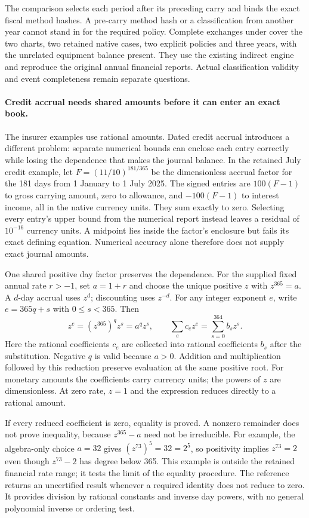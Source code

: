 The comparison selects each period after its preceding carry and binds the
exact fiscal method hashes. A pre-carry method hash or a classification from
another year cannot stand in for the required policy. Complete exchanges under
 cover the
two charts, two retained native cases, two explicit policies and three years,
with the unrelated equipment balance present. They use the existing indirect
engine and reproduce the original annual financial reports. Actual
classification validity and event completeness remain separate questions.


\paragraph{Credit accrual needs shared amounts before it can enter an exact book.}
The insurer examples use rational amounts. Dated credit accrual introduces a
different problem: separate numerical bounds can enclose each entry correctly
while losing the dependence that makes the journal balance. In the retained
July credit example, let $F=(11/10)^{181/365}$ be the dimensionless accrual
factor for the 181 days from 1 January to 1 July 2025. The signed entries are
$100(F-1)$ to gross carrying amount, zero to allowance, and $-100(F-1)$ to
interest income, all in the native currency units. They sum exactly to zero.
Selecting every entry's upper bound from the numerical report instead leaves
a residual of $10^{-16}$ currency units. A midpoint lies inside the factor's
enclosure but fails its exact defining equation. Numerical accuracy alone
therefore does not supply exact journal amounts.

One shared positive day factor preserves the dependence. For the supplied
fixed annual rate $r>-1$, set $a=1+r$ and choose the unique positive $z$ with
$z^{365}=a$. A $d$-day accrual uses $z^d$; discounting uses $z^{-d}$. For any
integer exponent $e$, write $e=365q+s$ with $0\leq s<365$. Then
\[
 z^e=(z^{365})^qz^s=a^qz^s,
 \qquad
 \sum_e c_ez^e=\sum_{s=0}^{364}b_sz^s .
\]
Here the rational coefficients $c_e$ are collected into rational coefficients
$b_s$ after the substitution. Negative $q$ is valid because $a>0$. Addition
and multiplication followed by this reduction preserve evaluation at the
same positive root. For monetary amounts the coefficients carry currency
units; the powers of $z$ are dimensionless. At zero rate, $z=1$ and the
expression reduces directly to a rational amount.

If every reduced coefficient is zero, equality is proved. A nonzero remainder
does not prove inequality, because $z^{365}-a$ need not be irreducible. For
example, the algebra-only choice $a=32$ gives $(z^{73})^5=32=2^5$, so positivity
implies $z^{73}=2$ even though $z^{73}-2$ has degree below 365. This example is
outside the retained financial rate range; it tests the limit of the equality
procedure. The reference returns an uncertified result whenever a required
identity does not reduce to zero. It provides division by rational constants
and inverse day powers, with no general polynomial inverse or ordering test.

